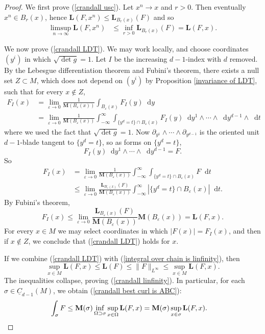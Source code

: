 \documentclass[reqno,11pt]{amsart}
\newcommand*\dif{\mathop{}\!\mathrm{d}}
\newcommand{\Chain}{\underline C}
\newcommand{\Mass}{\mathbf M}
\newcommand{\Comass}{\mathbf L}
\theoremstyle{definition}
\numberwithin{equation}{section}
\begin{document}
\begin{proof}
We first prove (\ref{crandall usc}).
Let $x^n \to x$ and $r > 0$. Then eventually $x^n \in B_r(x)$, hence $\Comass(F, x^n) \leq \Comass_{B_r(x)}(F)$ and so
\begin{align*}
\limsup_{n \to \infty} \Comass(F, x^n) &\leq \inf_{r > 0} \Comass_{B_r(x)}(F) = \Comass(F, x).
\end{align*}

We now prove (\ref{crandall LDT}).
We may work locally, and choose coordinates $(y^i)$ in which $\sqrt{\det g} = 1$.
Let $I$ be the increasing $d-1$-index with $d$ removed.
By the Lebesgue differentiation theorem and Fubini's theorem, there exists a null set $Z \subset M$, which does not depend on $(y^i)$ by Proposition \ref{invariance of LDT}, such that for every $x \notin Z$,
\begin{align*}
F_I(x) 
&= \lim_{\varepsilon \to 0} \frac{1}{\Mass(B_\varepsilon(x))} \int_{B_\varepsilon(x)} F_I(y) \dif y \\
&= \lim_{\varepsilon \to 0} \frac{1}{\Mass(B_\varepsilon(x))} \int_{-\infty}^\infty \int_{\{y^d = t\} \cap B_\varepsilon(x)} F_I(y) \dif y^1 \wedge \cdots \wedge \dif y^{d - 1} \wedge \dif t
\end{align*}
where we used the fact that $\sqrt{\det g} = 1$.
Now $\partial_{y^1} \wedge \cdots \wedge \partial_{y^{d - 1}}$ is the oriented unit $d - 1$-blade tangent to $\{y^d = t\}$, so as forms on $\{y^d = t\}$,
$$F_I(y) \dif y^1 \wedge \cdots \wedge \dif y^{d - 1} = F.$$
So
\begin{align*}
F_I(x) 
&= \lim_{\varepsilon \to 0} \frac{1}{\Mass(B_\varepsilon(x))} \int_{-\infty}^\infty \int_{\{y^d = t\} \cap B_\varepsilon(x)} F \dif t \\
&\leq \lim_{\varepsilon \to 0} \frac{\Comass_{B_\varepsilon(x)}(F)}{\Mass(B_\varepsilon(x))} \int_{-\infty}^\infty |\{y^d = t\} \cap B_\varepsilon(x)| \dif t.
\end{align*}
By Fubini's theorem,
$$F_I(x) \leq \lim_{\varepsilon \to 0} \frac{\Comass_{B_\varepsilon(x)}(F)}{\Mass(B_\varepsilon(x))} \Mass(B_\varepsilon(x)) = \Comass(F, x).$$
For every $x \in M$ we may select coordinates in which $|F(x)| = F_I(x)$, and then if $x \notin Z$, we conclude that (\ref{crandall LDT}) holds for $x$.

If we combine (\ref{crandall LDT}) with (\ref{integral over chain is linfinity}), then
$$\sup_{x \in M} \Comass(F, x) \leq \Comass(F) \leq \|F\|_{L^\infty} \leq \sup_{x \in M} \Comass(F, x).$$
The inequalities collapse, proving (\ref{crandall linfinity}).
In particular, for each $\sigma \in \Chain_{d - 1}(M)$, we obtain (\ref{crandall best curl is ABC}):
\begin{align*}
\int_\sigma F &\leq \Mass(\sigma) \inf_{\Omega \supset \sigma} \sup_{x \in \Omega} \Comass(F, x) = \Mass(\sigma) \sup_{x \in \sigma} \Comass(F, x). \qedhere
\end{align*}
\end{proof}
\end{document}
